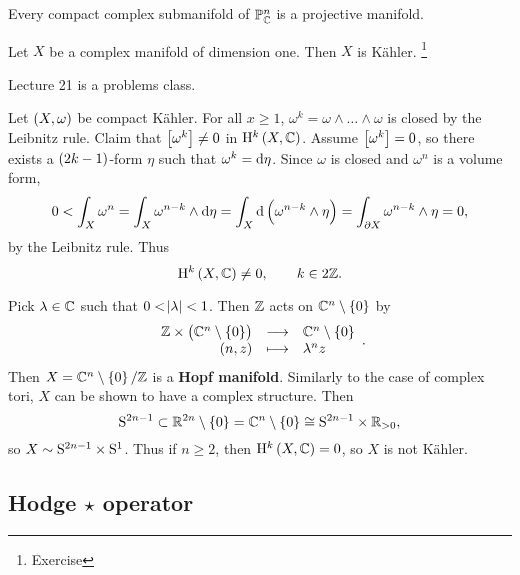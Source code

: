 \begin{fact*}
Every compact complex submanifold of $ \PP_\CC^n $ is a projective manifold.
\end{fact*}

\begin{example*}
Let $ X $ be a complex manifold of dimension one. Then $ X $ is K\"ahler. \footnote{Exercise}
\end{example*}


Lecture 21 is a problems class.

\pagebreak


Let $ \br{X, \omega} $ be compact K\"ahler. For all $ x \ge 1 $, $ \omega^k = \omega \wedge \dots \wedge \omega $ is closed by the Leibnitz rule. Claim that $ \sbr{\omega^k} \ne 0 $ in $ \H^k\br{X, \CC} $. Assume $ \sbr{\omega^k} = 0 $, so there exists a $ \br{2k - 1} $-form $ \eta $ such that $ \omega^k = \d\eta $. Since $ \omega $ is closed and $ \omega^n $ is a volume form,
$$ 0 < \int_X \omega^n = \int_X \omega^{n - k} \wedge \d\eta = \int_X \d\br{\omega^{n - k} \wedge \eta} = \int_{\partial X} \omega^{n - k} \wedge \eta = 0, $$
by the Leibnitz rule. Thus
$$ \H^k\br{X, \CC} \ne 0, \qquad k \in 2\ZZ. $$

\begin{example}
Pick $ \lambda \in \CC $ such that $ 0 < \abs{\lambda} < 1 $. Then $ \ZZ $ acts on $ \CC^n \setminus \cbr{0} $ by
$$ \function{\ZZ \times \br{\CC^n \setminus \cbr{0}}}{\CC^n \setminus \cbr{0}}{\br{n, z}}{\lambda^nz}. $$
Then $ X = \CC^n \setminus \cbr{0} / \ZZ $ is a \textbf{Hopf manifold}. Similarly to the case of complex tori, $ X $ can be shown to have a complex structure. Then
$$ \S^{2n - 1} \subset \RR^{2n} \setminus \cbr{0} = \CC^n \setminus \cbr{0} \cong \S^{2n - 1} \times \RR_{> 0}, $$
so $ X \sim \S^{2n - 1} \times \S^1 $. Thus if $ n \ge 2 $, then $ \H^k\br{X, \CC} = 0 $, so $ X $ is not K\"ahler.
\end{example}

\subsection{Hodge \texorpdfstring{$ \star $}{*} operator}


